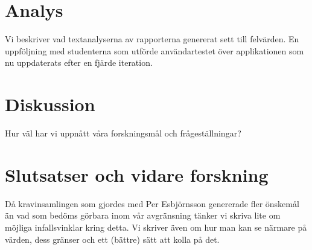 \documentclass[swedish]{maucsthesis}
\begin{document}
\section{Analys}
Vi beskriver vad textanalyserna av rapporterna genererat sett till felvärden. En
uppföljning med studenterna som utförde användartestet över applikationen som nu
uppdaterats efter en fjärde iteration.
\section{Diskussion}
Hur väl har vi uppnått våra forskningsmål och frågeställningar?
\section{Slutsatser och vidare forskning}
Då kravinsamlingen som gjordes med Per Esbjörnsson genererade fler önskemål än
vad som bedöms görbara inom vår avgränsning tänker vi skriva lite om möjliga
infallsvinklar kring detta.
Vi skriver även om hur man kan se närmare på värden, dess gränser och ett (bättre) sätt att kolla på det.

%
\newpage
{}


\end{document}
